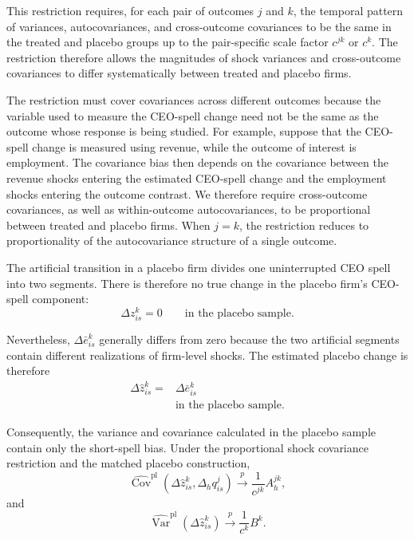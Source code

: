 \documentclass[sigconf,nonacm]{acmart}
\begin{document}
This restriction requires, for each pair of outcomes \(j\) and \(k\), the temporal pattern of variances, autocovariances, and cross-outcome covariances to be the same in the treated and placebo groups up to the pair-specific scale factor \(c^{jk}\) or \(c^{k}\). The restriction therefore allows the magnitudes of shock variances and cross-outcome covariances to differ systematically between treated and placebo firms.

The restriction must cover covariances across different outcomes
because the variable used to measure the CEO-spell change need not be
the same as the outcome whose response is being studied. For example,
suppose that the CEO-spell change is measured using revenue, while the
outcome of interest is employment. The covariance bias then depends on
the covariance between the revenue shocks entering the estimated
CEO-spell change and the employment shocks entering the outcome
contrast. We therefore require cross-outcome covariances, as well as
within-outcome autocovariances, to be proportional between treated and
placebo firms. When $j=k$, the restriction reduces to proportionality
of the autocovariance structure of a single outcome.

The artificial transition in a placebo firm divides one uninterrupted
CEO spell into two segments. There is therefore no true change in the
placebo firm's CEO-spell component:
\begin{equation}
\Delta z_{is}^{k}=0
\qquad
\text{in the placebo sample}.
\label{eq:placebo_true_change}
\end{equation}

Nevertheless, $\Delta\bar e_{is}^{k}$ generally differs from zero because the two artificial segments contain different realizations of firm-level shocks. The estimated placebo change is therefore
\begin{align}
\Delta\widehat z_{is}^{k}
={}&
\Delta\bar e_{is}^{k}
\nonumber\\
&\text{in the placebo sample}.
\label{eq:placebo_estimated_change}
\end{align}

Consequently, the variance and covariance calculated in the placebo
sample contain only the short-spell bias. Under the proportional shock covariance restriction and the matched
placebo construction,
\begin{equation}
\widehat{\operatorname{Cov}}^{\mathrm{pl}}\!\left(
\Delta\widehat z_{is}^{k},
\Delta_h q_{is}^{j}
\right)
\overset{p}{\longrightarrow}
\frac{1}{c^{jk}}A_h^{jk},
\label{eq:placebo_covariance}
\end{equation}
and
\begin{equation}
\widehat{\operatorname{Var}}^{\mathrm{pl}}\!\left(
\Delta\widehat z_{is}^{k}
\right)
\overset{p}{\longrightarrow}
\frac{1}{c^{k}}B^k.
\label{eq:placebo_variance}
\end{equation}
\end{document}
